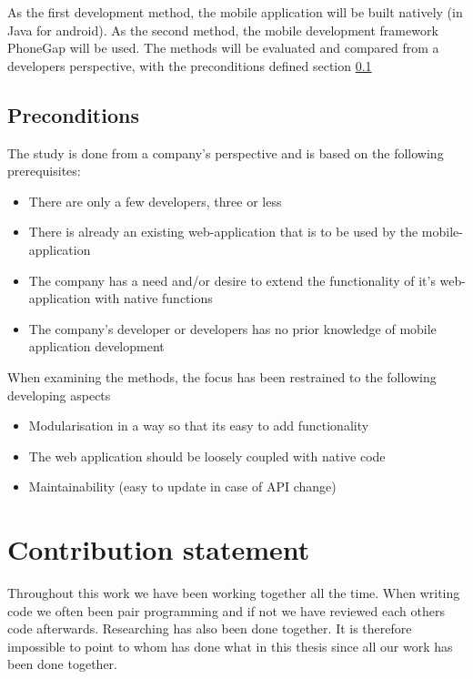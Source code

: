 As the first development method, the mobile application will be built natively (in Java for android). As the second method, the mobile development framework PhoneGap will be used. The methods will be evaluated and compared from a developers perspective, with the preconditions defined section \ref{section-preconditions}

\subsection{Preconditions}\label{section-preconditions}
The study is done from a company's perspective and is based on the following prerequisites:
\begin{itemize}
\item There are only a few developers, three or less
\item There is already an existing web-application that is to be used by the mobile-application
\item The company has a need and/or desire to extend the functionality of it's web-application with native functions
\item The company's developer or developers has no prior knowledge of mobile application development
\end{itemize}

When examining the methods, the focus has been restrained to the following developing aspects
\begin{itemize}
\item Modularisation in a way so that its easy to add functionality
\item The web application should be loosely coupled with native code
\item Maintainability (easy to update in case of API change)
\end{itemize}
\section{Contribution statement}
Throughout this work we have been working together all the time. When writing code we often been pair programming and if not we have reviewed each others code afterwards. Researching has also been done together. It is therefore impossible to point to whom has done what in this thesis since all our work has been done together. 


